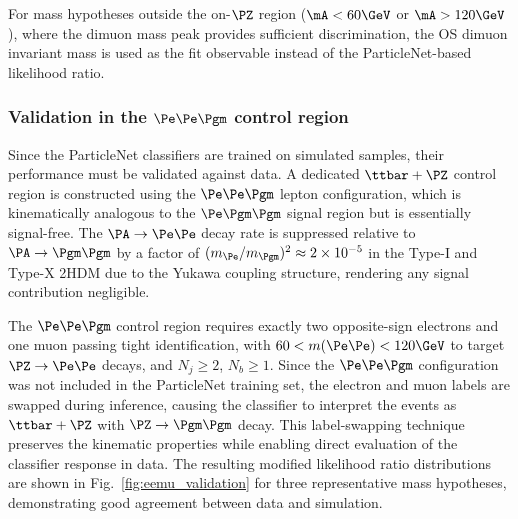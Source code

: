 For mass hypotheses outside the on-$\PZ$ region ($\mA < 60\GeV$ or $\mA > 120\GeV$), where the dimuon mass peak provides sufficient discrimination, the OS dimuon invariant mass is used as the fit observable instead of the ParticleNet-based likelihood ratio.

\subsubsection{Validation in the $\Pe\Pe\Pgm$ control region}
\label{sssec:eemu_validation}

Since the ParticleNet classifiers are trained on simulated samples, their performance must be validated against data. A dedicated $\ttbar+\PZ$ control region is constructed using the $\Pe\Pe\Pgm$ lepton configuration, which is kinematically analogous to the $\Pe\Pgm\Pgm$ signal region but is essentially signal-free. The $\PA \to \Pe\Pe$ decay rate is suppressed relative to $\PA \to \Pgm\Pgm$ by a factor of $(m_\Pe / m_\Pgm)^2 \approx 2 \times 10^{-5}$ in the Type-I and Type-X 2HDM due to the Yukawa coupling structure, rendering any signal contribution negligible.

The $\Pe\Pe\Pgm$ control region requires exactly two opposite-sign electrons and one muon passing tight identification, with $60 < m(\Pe\Pe) < 120\GeV$ to target $\PZ \to \Pe\Pe$ decays, and $N_j \geq 2$, $N_b \geq 1$. Since the $\Pe\Pe\Pgm$ configuration was not included in the ParticleNet training set, the electron and muon labels are swapped during inference, causing the classifier to interpret the events as $\ttbar+\PZ$ with $\PZ \to \Pgm\Pgm$ decay. This label-swapping technique preserves the kinematic properties while enabling direct evaluation of the classifier response in data. The resulting modified likelihood ratio distributions are shown in Fig.~\ref{fig:eemu_validation} for three representative mass hypotheses, demonstrating good agreement between data and simulation.

